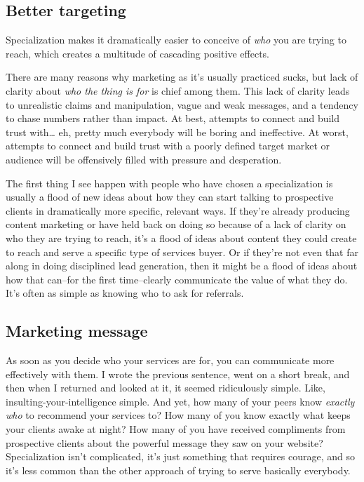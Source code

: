 \subsection{Better targeting}

Specialization makes it dramatically easier to conceive of \emph{who} you are trying to reach, which creates a multitude of cascading positive effects.

There are many reasons why marketing as it's usually practiced sucks, but lack of clarity about \emph{who the thing is for} is chief among them. This lack of clarity leads to unrealistic claims and manipulation, vague and weak messages, and a tendency to chase numbers rather than impact.  At best, attempts to connect and build trust with\ldots{} eh, pretty much everybody will be boring and ineffective. At worst, attempts to connect and build trust with a poorly defined target market or audience will be offensively filled with pressure and desperation.

The first thing I see happen with people who have chosen a specialization is usually a flood of new ideas about how they can start talking to prospective clients in dramatically more specific, relevant ways. If they're already producing content marketing or have held back on doing so because of a lack of clarity on who they are trying to reach, it's a flood of ideas about content they could create to reach and serve a specific type of services buyer. Or if they're not even that far along in doing disciplined lead generation, then it might be a flood of ideas about how that can--for the first time--clearly communicate the value of what they do. It's often as simple as knowing who to ask for referrals.

\subsection{Marketing message}

As soon as you decide who your services are for, you can communicate more effectively with them. I wrote the previous sentence, went on a short break, and then when I returned and looked at it, it seemed ridiculously simple. Like, insulting-your-intelligence simple. And yet, how many of your peers know \emph{exactly who} to recommend your services to? How many of you know exactly what keeps your clients awake at night? How many of you have received compliments from prospective clients about the powerful message they saw on your website? Specialization isn't complicated, it's just something that requires courage, and so it's less common than the other approach of trying to serve basically everybody.

